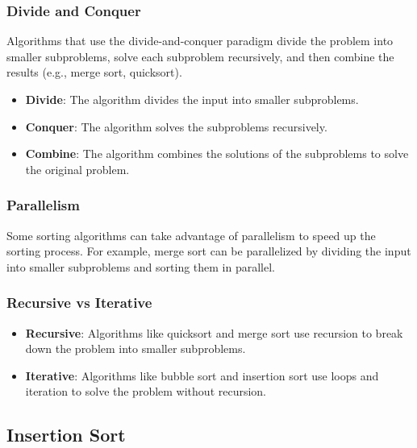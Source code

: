 \subsubsection*{Divide and Conquer}

Algorithms that use the divide-and-conquer paradigm divide the problem into smaller subproblems, solve each subproblem recursively, and then combine the results (e.g., merge sort, quicksort).
\begin{itemize}
    \item \textbf{Divide}: The algorithm divides the input into smaller subproblems.
    \item \textbf{Conquer}: The algorithm solves the subproblems recursively.
    \item \textbf{Combine}: The algorithm combines the solutions of the subproblems to solve the original problem.
\end{itemize}

\subsubsection*{Parallelism}

Some sorting algorithms can take advantage of parallelism to speed up the sorting process. For example, merge sort can be parallelized by dividing the input into smaller subproblems and sorting them in parallel.

\subsubsection*{Recursive vs Iterative}

\begin{itemize}
    \item \textbf{Recursive}: Algorithms like quicksort and merge sort use recursion to break down the problem into smaller subproblems.
    \item \textbf{Iterative}: Algorithms like bubble sort and insertion sort use loops and iteration to solve the problem without recursion.
\end{itemize}

\newpage

\subsection{Insertion Sort}

